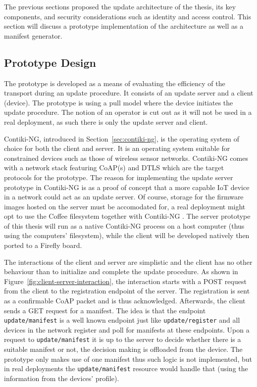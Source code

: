 \documentclass[0-thesis.tex]{subfiles}
\begin{document}
The previous sections proposed the update architecture of the thesis, its key components,
and security considerations such as identity and access control. This section will discuss
a prototype implementation of the architecture as well as a manifest generator. 

\subsection{Prototype Design}
\label{ssec:prototype-design}
The prototype is developed as a means of evaluating the efficiency of the transport during
an update procedure. It consists of an update server and a client (device). The prototype
is using a pull model where the device initiates the update procedure. The notion of an
operator is cut out as it will not be used in a real deployment, as such there is only the
update server and client.

Contiki-NG, introduced in Section~\ref{sec:contiki-ng}, is the operating system of choice
for both the client and server. It is an operating system suitable for constrained devices
such as those of wireless sensor networks. Contiki-NG comes with a network stack featuring
CoAP(s) and DTLS which are the target protocols for the prototype. The reason for
implementing the update server prototype in Contiki-NG is as a proof of concept that a
more capable IoT device in a network could act as an update server. Of course, storage for
the firmware images hosted on the server must be accomodated for, a real deployment might
opt to use the Coffee filesystem together with Contiki-NG \parencite{coffee}. The server
prototype of this thesis will run as a native Contiki-NG process on a host computer (thus
using the computers' filesystem), while the client will be developed natively then ported
to a Firefly board.

The interactions of the client and server are simplistic and the client has no other
behaviour than to initialize and complete the update procedure. As shown in
Figure~\ref{fig:client-server-interaction}, the interaction starts with a POST request
from the client to the registration endpoint of the server. The registration is sent as a
confirmable CoAP packet and is thus acknowledged. Afterwards, the client sends a GET
request for a manifest. The idea is that the endpoint \texttt{update/manifest} is a well
known endpoint just like \texttt{update/register} and all devices in the network register
and poll for manifests at these endpoints. Upon a request to \texttt{update/manifest} it
is up to the server to decide whether there is a suitable manifest or not, the decision
making is offloaded from the device. The prototype only makes use of one manifest thus
such logic is not implemented, but in real deployments the \texttt{update/manifest}
resource would handle that (using the information from the devices' profile).
\end{document}
